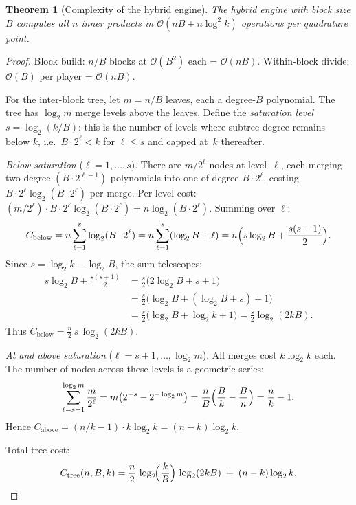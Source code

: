 \documentclass[11pt]{article}
\newtheorem{theorem}{Theorem}[section]
\newcommand{\bigO}{\mathcal{O}}
\begin{document}
\begin{theorem}[Complexity of the hybrid engine]\label{thm:hybrid-complexity}
The hybrid engine with block size $B$ computes all $n$ inner products in
$\bigO(nB + n\log^2 k)$ operations per quadrature point.
\end{theorem}
\begin{proof}
Block build: $n/B$ blocks at $\bigO(B^2)$ each = $\bigO(nB)$.
Within-block divide: $\bigO(B)$ per player = $\bigO(nB)$.

For the inter-block tree, let $m = n/B$ leaves, each a degree-$B$
polynomial. The tree has $\log_2 m$ merge levels above the leaves.
Define the \emph{saturation level} $s = \log_2(k/B)$: this is the number
of levels where subtree degree remains below $k$, i.e.\ $B \cdot 2^\ell
< k$ for $\ell \le s$ and capped at~$k$ thereafter.

\noindent\textit{Below saturation} ($\ell = 1,\ldots,s$). There are
$m/2^\ell$ nodes at level~$\ell$, each merging two degree-$(B \cdot
2^{\ell-1})$ polynomials into one of degree $B \cdot 2^\ell$, costing
$B \cdot 2^\ell \log_2(B \cdot 2^\ell)$ per merge. Per-level cost:
$(m/2^\ell) \cdot B \cdot 2^\ell \log_2(B \cdot 2^\ell)
= n \log_2(B \cdot 2^\ell)$. Summing over $\ell$:
\[
  C_{\text{below}} = n\sum_{\ell=1}^{s} \log_2(B \cdot 2^\ell)
  = n\sum_{\ell=1}^{s} (\log_2 B + \ell)
  = n\Bigl(s\log_2 B + \frac{s(s+1)}{2}\Bigr).
\]
Since $s = \log_2 k - \log_2 B$, the sum telescopes:
\begin{align*}
  s\log_2 B + \frac{s(s+1)}{2}
  &= \frac{s}{2}\bigl(2\log_2 B + s + 1\bigr) \\
  &= \frac{s}{2}\bigl(\log_2 B + (\log_2 B + s) + 1\bigr) \\
  &= \frac{s}{2}\bigl(\log_2 B + \log_2 k + 1\bigr)
   = \frac{s}{2}\log_2(2kB).
\end{align*}
Thus $C_{\text{below}} = \frac{n}{2}\,s\,\log_2(2kB)$.

\noindent\textit{At and above saturation} ($\ell = s{+}1,\ldots,\log_2 m$).
All merges cost $k\log_2 k$ each. The number of nodes across these levels
is a geometric series:
\[
  \sum_{\ell=s+1}^{\log_2 m} \frac{m}{2^\ell}
  = m\bigl(2^{-s} - 2^{-\log_2 m}\bigr)
  = \frac{n}{B}\Bigl(\frac{B}{k} - \frac{B}{n}\Bigr)
  = \frac{n}{k} - 1.
\]
Hence $C_{\text{above}} = (n/k - 1) \cdot k\log_2 k = (n - k)\log_2 k$.

Total tree cost:
\begin{equation}\label{eq:tree-cost-exact}
  C_{\text{tree}}(n,B,k)
  = \frac{n}{2}\,\log_2\!\Bigl(\frac{k}{B}\Bigr)\,
    \log_2(2kB) \;+\; (n - k)\log_2 k.
\end{equation}


\end{proof}
\end{document}
